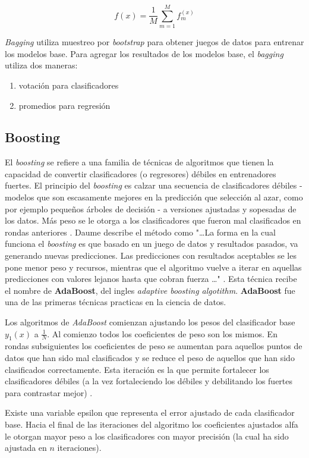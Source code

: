 \[ f(x) = \frac{1}{M} \sum_{m=1}^M f_m^{(x)} \]

\emph{Bagging} utiliza muestreo por \emph{bootstrap} para obtener juegos de datos para entrenar los modelos base. Para agregar los resultados de los modelos base, el \emph{bagging} utiliza dos maneras:
\begin{enumerate}
  \item votación para clasificadores
  \item promedios para regresión
\end{enumerate}

\subsection{Boosting}
El \emph{boosting} se refiere a una familia de técnicas de algoritmos que tienen la capacidad de convertir clasificadores (o regresores) débiles en entrenadores fuertes. El principio del \emph{boosting} es calzar una secuencia de clasificadores débiles - modelos que son escasamente mejores en la predicción que selección al azar, como por ejemplo pequeños árboles de decisión - a versiones ajustadas y sopesadas de los datos. Más peso se le otorga a los clasificadores que fueron mal clasificados en rondas anteriores \cite{smolyakov}. Daume describe el método como "\ldots La forma en la cual funciona el \emph{boosting} es que basado en un juego de datos y resultados pasados, va generando nuevas predicciones. Las predicciones con resultados aceptables se les pone menor peso y recursos, mientras que el algoritmo vuelve a iterar en aquellas predicciones con valores lejanos hasta que cobran fuerza \ldots" \cite{daume}. Esta técnica recibe el nombre de \textbf{AdaBoost}, del ingles \emph{adaptive boosting algotithm}. \textbf{AdaBoost} fue una de las primeras técnicas practicas en la ciencia de datos.

Los algoritmos de \emph{AdaBoost} comienzan ajustando los pesos del clasificador base \(y_1(x)\) a \(\frac{1}{N}\). Al comienzo todos los coeficientes de peso son los mismos. En rondas subsiguientes los coeficientes de peso se aumentan para aquellos puntos de datos que han sido mal clasificados y se reduce el peso de aquellos que han sido clasificados correctamente. Esta iteración es la que permite fortalecer los clasificadores débiles (a la vez fortaleciendo los débiles y debilitando los fuertes para contrastar mejor) \cite{smolyakov}. 

Existe una variable epsilon que representa el error ajustado de cada clasificador base. Hacia el final de las iteraciones del algoritmo los coeficientes ajustados alfa le otorgan mayor peso a los clasificadores con mayor precisión (la cual ha sido ajustada en \(n\) iteraciones). 

